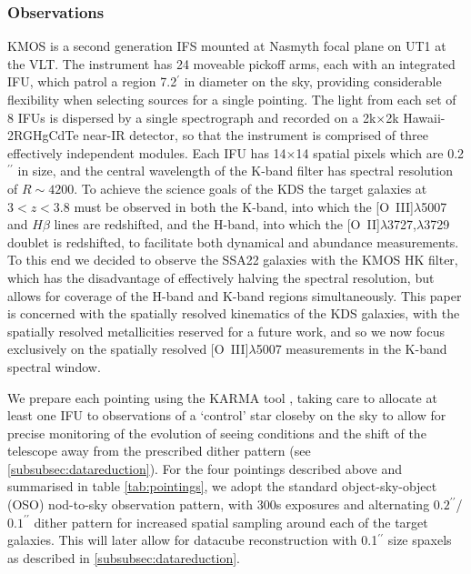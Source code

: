 \documentclass[fleqn,usenatbib]{mn2e}
\begin{document}
\subsubsection{Observations}\label{subsubsec:Obs}
KMOS is a second generation IFS mounted at Nasmyth focal plane on UT1 at the VLT.
The instrument has 24 moveable pickoff arms, each with an integrated IFU, which patrol a region 7.2$^{\prime}$ in diameter on the sky, providing considerable flexibility when selecting sources for a single pointing.
The light from each set of 8 IFUs is dispersed by a single spectrograph and recorded on a 2k$\times$2k Hawaii-2RGHgCdTe near-IR detector, so that the instrument is comprised of three effectively independent modules.
Each IFU has 14$\times$14 spatial pixels which are 0.2$^{\prime\prime}$ in size, and the central wavelength of the K-band filter has spectral resolution of $R \sim 4200$.
To achieve the science goals of the KDS the target galaxies at $3 < z < 3.8$ must be observed in both the K-band, into which the [O~{\sc III}]$\lambda$5007 and $H\beta$ lines are redshifted, and the H-band, into which the [O~{\sc II}]$\lambda$3727,$\lambda$3729 doublet is redshifted, to facilitate both dynamical and abundance measurements.
To this end we decided to observe the SSA22 galaxies with the KMOS HK filter, which has the disadvantage of effectively halving the spectral resolution, but allows for coverage of the H-band and K-band regions simultaneously.
This paper is concerned with the spatially resolved kinematics of the KDS galaxies, with the spatially resolved metallicities reserved for a future work, and so we now focus exclusively on the spatially resolved [O~{\sc III}]$\lambda$5007 measurements in the K-band spectral window.

We prepare each pointing using the KARMA tool \citep{Wegner2008}, taking care to allocate at least one IFU to observations of a `control' star closeby on the sky to allow for precise monitoring of the evolution of seeing conditions and the shift of the telescope away from the prescribed dither pattern (see \cref{subsubsec:datareduction}).
For the four pointings described above and summarised in table \ref{tab:pointings}, we adopt the standard object-sky-object (OSO) nod-to-sky observation pattern, with 300s exposures and alternating $0.2^{\prime\prime}$/$0.1^{\prime\prime}$ dither pattern for increased spatial sampling around each of the target galaxies.
This will later allow for datacube reconstruction with 0.1$^{\prime\prime}$ size spaxels as described in \cref{subsubsec:datareduction}.
\end{document}
